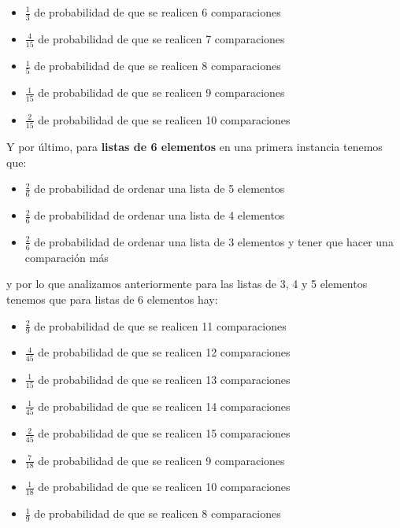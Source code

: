 \documentclass[11pt]{article}
\begin{document}
\begin{itemize}
    \item $\frac{1}{3}$ de probabilidad de que se realicen 6 comparaciones
    \item $\frac{4}{15}$ de probabilidad de que se realicen 7 comparaciones
    \item $\frac{1}{5}$ de probabilidad de que se realicen 8 comparaciones
    \item $\frac{1}{15}$ de probabilidad de que se realicen 9 comparaciones
    \item $\frac{2}{15}$ de probabilidad de que se realicen 10 comparaciones
\end{itemize}

Y por último, para \textbf{listas de 6 elementos} en una primera instancia tenemos que: 

\begin{itemize}
    \item $\frac{2}{6}$ de probabilidad de ordenar una lista de 5 elementos
    \item $\frac{2}{6}$ de probabilidad de ordenar una lista de 4 elementos
    \item $\frac{2}{6}$ de probabilidad de ordenar una lista de 3 elementos y tener que hacer una comparación más
\end{itemize}

y por lo que analizamos anteriormente para las listas de 3, 4 y 5 elementos tenemos que para listas de 6 elementos hay: 

\begin{itemize}
    \item $\frac{2}{9}$ de probabilidad de que se realicen 11 comparaciones
    \item $\frac{4}{45}$ de probabilidad de que se realicen 12 comparaciones
    \item $\frac{1}{15}$ de probabilidad de que se realicen 13 comparaciones
    \item $\frac{1}{45}$ de probabilidad de que se realicen 14 comparaciones
    \item $\frac{2}{45}$ de probabilidad de que se realicen 15 comparaciones
    \item $\frac{7}{18}$ de probabilidad de que se realicen 9 comparaciones
    \item $\frac{1}{18}$ de probabilidad de que se realicen 10 comparaciones
    \item $\frac{1}{9}$ de probabilidad de que se realicen 8 comparaciones
\end{itemize}
\end{document}
